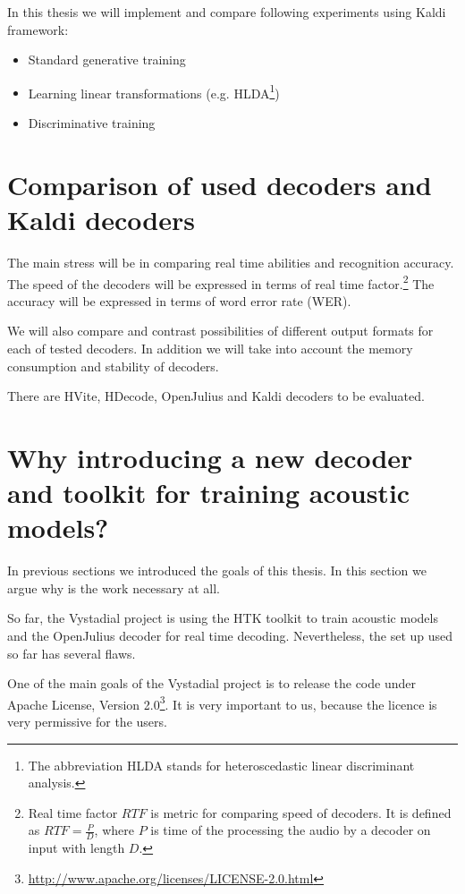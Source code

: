 In this thesis we will implement and compare following experiments using Kaldi framework:
\begin{itemize}
    \item Standard generative training
    \item Learning linear transformations (e.g. HLDA\footnote{The abbreviation HLDA stands for heteroscedastic linear discriminant analysis.})
    \item Discriminative training 
\end{itemize}

 

\section{Comparison of used decoders and Kaldi decoders} 
\label{sec:compare_rt}
The main stress will be in comparing real time abilities and recognition accuracy. The speed of the decoders will be expressed in terms of real time factor.\footnote{Real time factor $RTF$ is metric for comparing speed of decoders. It is defined as $RTF = \frac{P}{D}$, where $P$ is time of the processing the audio by a decoder on input with length $D$.} The accuracy will be expressed in terms of word error rate (WER).

We will also compare and contrast possibilities of different output formats for each of tested decoders.
In addition we will take into account the memory consumption and stability of decoders.

There are HVite, HDecode, OpenJulius and Kaldi decoders to be evaluated.


    
\section{Why introducing a new decoder and toolkit for training acoustic models?} 
\label{sec:why}
In previous sections we introduced the goals of this thesis. In this section we argue why is the work necessary at all.

So far, the Vystadial project is using the HTK toolkit to train acoustic models and the OpenJulius decoder for real time decoding.
Nevertheless, the set up used so far has several flaws.

One of the main goals of the Vystadial project is to release the code under Apache License, Version 2.0\footnote{\url{http://www.apache.org/licenses/LICENSE-2.0.html}}. It is very important to us, because the licence is very permissive for the users. 

